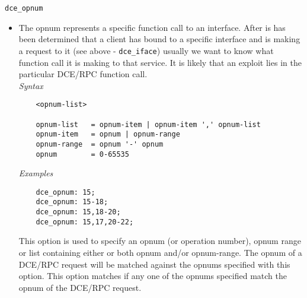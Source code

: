 \documentclass[english]{report}
\begin{document}
\texttt{dce\_opnum}
\label{dcerpc2:dce_opnum}
\begin{itemize}

\item[] The opnum represents a specific function call to an interface. After is
has been determined that a client has bound to a specific interface and is
making a request to it (see above - \texttt{dce\_iface}) usually we want to
know what function call it is making to that service. It is likely that an
exploit lies in the particular DCE/RPC function call.\\

\textit{Syntax}
\footnotesize
\begin{verbatim}
    <opnum-list>

    opnum-list   = opnum-item | opnum-item ',' opnum-list
    opnum-item   = opnum | opnum-range
    opnum-range  = opnum '-' opnum
    opnum        = 0-65535
\end{verbatim}
\normalsize
\textit{Examples}
\footnotesize
\begin{verbatim}
    dce_opnum: 15;
    dce_opnum: 15-18;
    dce_opnum: 15,18-20;
    dce_opnum: 15,17,20-22;
\end{verbatim}
\normalsize

This option is used to specify an opnum (or operation number), opnum range or
list containing either or both opnum and/or opnum-range. The opnum of a DCE/RPC
request will be matched against the opnums specified with this option.  This
option matches if any one of the opnums specified match the opnum of the
DCE/RPC request.

\end{itemize}
\end{document}
